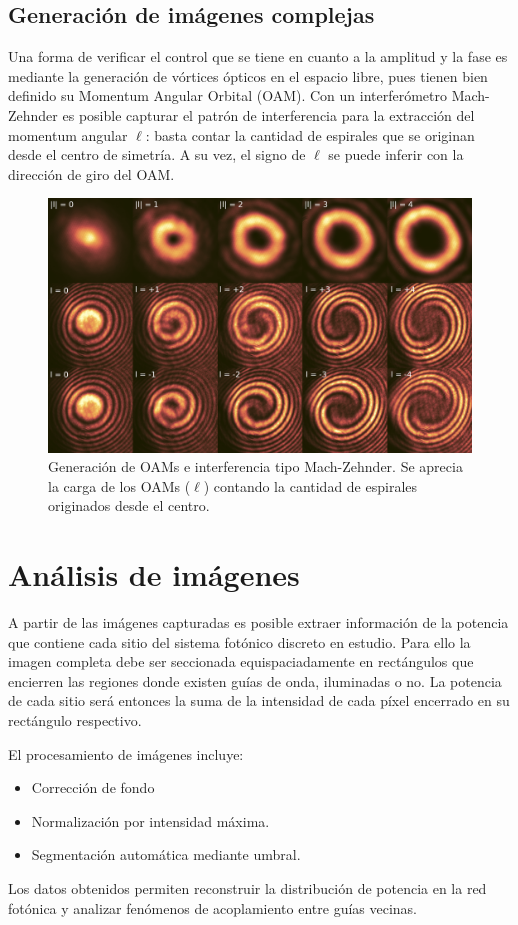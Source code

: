 \subsection{Generación de imágenes complejas \label{cap:oam}}
Una forma de verificar el control que se tiene en cuanto a la amplitud y la fase es mediante la generación de vórtices ópticos en el espacio libre, pues tienen bien definido su Momentum Angular Orbital (OAM). Con un interferómetro Mach-Zehnder es posible capturar el patrón de interferencia para la extracción del momentum angular $\ell$: basta contar la cantidad de espirales que se originan desde el centro de simetría. A su vez, el signo de $\ell$ se puede inferir con la dirección de giro del OAM.
\begin{figure}[H]
	\centering
	\includegraphics[width=0.8\linewidth]{media/OAM-free.png}
	\caption[Generación de OAMs e interferencia tipo Mach-Zehnder.]{Generación de OAMs e interferencia tipo Mach-Zehnder. Se aprecia la carga de los OAMs ($\ell$) contando la cantidad de espirales originados desde el centro. \label{fig:OAM}}
\end{figure}
\section{Análisis de imágenes \label{sec:analimag}}
A partir de las imágenes capturadas es posible extraer información de la potencia que contiene cada sitio del sistema fotónico discreto en estudio. Para ello la imagen completa debe ser seccionada equispaciadamente en rectángulos que encierren las regiones donde existen guías de onda, iluminadas o no. La potencia de cada sitio será entonces la suma de la intensidad de cada píxel encerrado en su rectángulo respectivo.

El procesamiento de imágenes incluye:
\begin{itemize}
    \item Corrección de fondo
    \item Normalización por intensidad máxima.
    \item Segmentación automática mediante umbral.
\end{itemize}

Los datos obtenidos permiten reconstruir la distribución de potencia en la red fotónica y analizar fenómenos de acoplamiento entre guías vecinas.